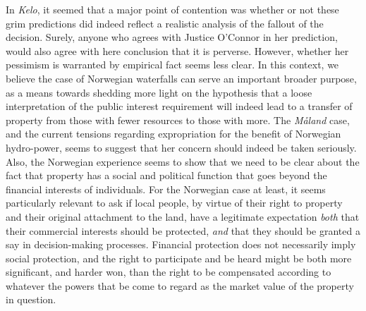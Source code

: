 In \emph{Kelo}, it seemed that a major point of contention was whether or not these grim predictions did indeed reflect a realistic analysis of the fallout of the decision. Surely, anyone who agrees with Justice O'Connor in her prediction, would also agree with here conclusion that it is perverse. However, whether her pessimism is warranted by empirical fact seems less clear. In this context, we believe the case of Norwegian waterfalls can serve an important broader purpose, as a means towards shedding more light on the hypothesis that a loose interpretation of the public interest requirement will indeed lead to a transfer of property from those with fewer resources to those with more. The \emph{Måland} case, and the current tensions regarding expropriation for the benefit of Norwegian hydro-power, seems to suggest that her concern should indeed be taken seriously. Also, the Norwegian experience seems to show that we need to be clear about the fact that property has a social and political function that goes beyond the financial interests of individuals. For the Norwegian case at least, it seems particularly relevant to ask if local people, by virtue of their right to property and their original attachment to the land, have a legitimate expectation \emph{both} that their commercial interests should be protected, \emph{and} that they should be granted a say in decision-making processes. Financial protection does not necessarily imply social protection, and the right to participate and be heard might be both more significant, and harder won, than the right to be compensated according to whatever the powers that be come to regard as the market value of the property in question.

